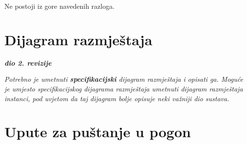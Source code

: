 			 	Ne postoji iz gore navedenih razloga.
			
			\eject 
		
		
		\section{Dijagram razmještaja}
			
			\textbf{\textit{dio 2. revizije}}
			
			 \textit{Potrebno je umetnuti \textbf{specifikacijski} dijagram razmještaja i opisati ga. Moguće je umjesto specifikacijskog dijagrama razmještaja umetnuti dijagram razmještaja instanci, pod uvjetom da taj dijagram bolje opisuje neki važniji dio sustava.}
			
			\eject 
		
		\section{Upute za puštanje u pogon}
			
		
			
